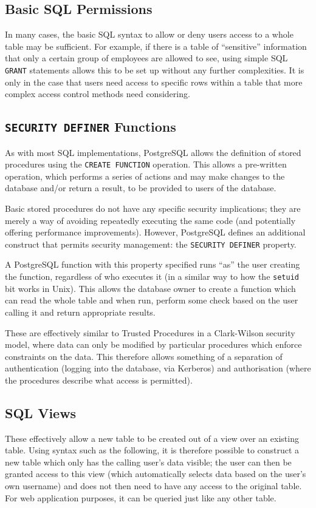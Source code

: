 \documentclass[12pt]{report}
\begin{document}
\subsection{Basic SQL Permissions}
In many cases, the basic SQL syntax to allow or deny users access to a whole table may be sufficient. For example, if there is a table of ``sensitive'' information that only a certain group of employees are allowed to see, using simple SQL \texttt{GRANT} statements allows this to be set up without any further complexities. It is only in the case that users need access to specific rows within a table that more complex access control methods need considering.

\subsection{\texttt{SECURITY DEFINER} Functions}
As with most SQL implementations, PostgreSQL allows the definition of stored procedures using the \texttt{CREATE FUNCTION} operation. This allows a pre-written operation, which performs a series of actions and may make changes to the database and/or return a result, to be provided to users of the database.

Basic stored procedures do not have any specific security implications; they are merely a way of avoiding repeatedly executing the same code (and potentially offering performance improvements). However, PostgreSQL defines an additional construct that permits security management: the \texttt{SECURITY DEFINER} property.

A PostgreSQL function with this property specified runs ``as'' the user creating the function, regardless of who executes it\cite{postgres-SEC_DEF} (in a similar way to how the \texttt{setuid} bit works in Unix). This allows the database owner to create a function which can read the whole table and when run, perform some check based on the user calling it and return appropriate results.

These are effectively similar to Trusted Procedures in a Clark-Wilson security model, where data can only be modified by particular procedures which enforce constraints on the data. This therefore allows something of a separation of authentication (logging into the database, via Kerberos) and authorisation (where the procedures describe what access is permitted).

\subsection{SQL Views}
These effectively allow a new table to be created out of a view over an existing table. Using syntax such as the following, it is therefore possible to construct a new table which only has the calling user's data visible; the user can then be granted access to this view (which automatically selects data based on the user's own username) and does not then need to have any access to the original table. For web application purposes, it can be queried just like any other table.
\end{document}
